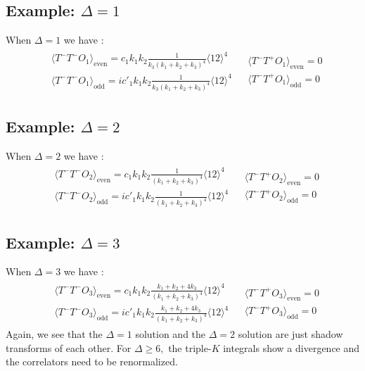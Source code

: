 \documentclass[a4paper,11pt]{article}
\begin{document}
\subsection*{Example: $\Delta=1$}
When $\Delta=1$ we have :
\begin{align}
\begin{split}
&\langle T^-T^-O_1 \rangle_{\text{even}} = c_1 k_1 k_2\frac{1}{k_3(k_1+k_2+k_3)^4}\langle 12 \rangle^4\\[5 pt]
&\langle T^-T^-O_1\rangle_{\text{odd}} = ic'_1 k_1k _2\frac{1}{k_3(k_1+k_2+k_3)^4}\langle 12 \rangle^4
\end{split}
\begin{split}
&\langle T^-T^+O_1 \rangle_{\text{even}} =0\\[5 pt]
&\langle T^-T^+O_1 \rangle_{\text{odd}} =0
\end{split}
\end{align}
\subsection*{Example: $\Delta=2$}
When $\Delta=2$ we have :
\begin{align}
\begin{split}
&\langle T^-T^-O_2 \rangle_{\text{even}} = c_1 k_1 k_2\frac{1}{(k_1+k_2+k_3)^4}\langle 12 \rangle^4\\[5 pt]
&\langle T^-T^-O_2\rangle_{\text{odd}} = ic'_1 k_1k _2\frac{1}{(k_1+k_2+k_3)^4}\langle 12 \rangle^4
\end{split}
\begin{split}
&\langle T^-T^+O_2 \rangle_{\text{even}} =0\\[5 pt]
&\langle T^-T^+O_2 \rangle_{\text{odd}} =0
\end{split}
\end{align}
\subsection*{Example: $\Delta=3$}
When $\Delta=3$ we have :
\begin{align}
\begin{split}
&\langle T^-T^-O_3 \rangle_{\text{even}} = c_1 k_1 k_2\frac{k_1+k_2+4k_3}{(k_1+k_2+k_3)^4}\langle 12 \rangle^4\\[5 pt]
&\langle T^-T^-O_3 \rangle_{\text{odd}} = ic'_1 k_1 k_2\frac{k_1+k_2+4k_3}{(k_1+k_2+k_3)^4}\langle 12 \rangle^4
\end{split}
\begin{split}
&\langle T^-T^+O_3 \rangle_{\text{even}} =0\\[5 pt]
&\langle T^-T^+O_3 \rangle_{\text{odd}} =0
\end{split}
\end{align}
Again, we see that the $\Delta=1$ solution and the $\Delta=2$ solution are just shadow transforms of each other. For $\Delta \ge 6,$ the triple-$K$ integrals show a divergence and the correlators need to be renormalized.
\end{document}
